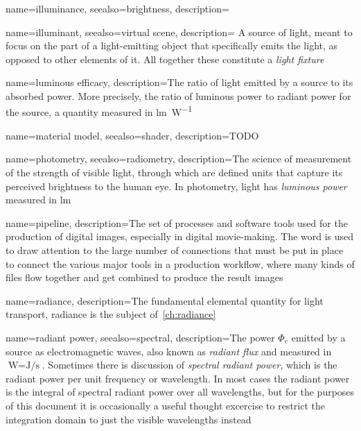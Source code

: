 {
	name=illuminance,
	seealso={brightness},
	description=\nopostdesc
}

{
	name=illuminant,
	seealso={virtual scene},
	description={
		A source of light, meant to focus on the part of a light-emitting object that
	    specifically emits the light, as opposed to other elements of it. All together
        these constitute a \textsl{light fixture}}
}

{
	name={luminous efficacy},
	description={The ratio of light emitted by a source to its absorbed power.
		More precisely, the ratio of luminous power to radiant power for the source,
		a quantity measured in \unit{\lumen\per\watt}}
}

{
	name={material model},
	seealso={shader},
	description={TODO}
}

{
	name={photometry},
	seealso={radiometry},
	description={The science of measurement of the strength of visible light, 
		through which are defined units that capture its perceived brightness 
		to the human eye. In photometry, light has \textsl{luminous power} 
		measured in \unit{\lumen}}
}


{
	name={pipeline},
	description={The set of processes and software tools used for the production of 
		digital images, especially in digital movie-making. The word is used to draw
		attention to the large number of connections that must be put in place to 
		connect the various major tools in a production workflow, where many kinds
		of files flow together and get combined to produce the result images}
}

{
	name=radiance,
	description={The fundamental elemental quantity for light transport, radiance
		is the subject of~\cref{ch:radiance}}
}

{
	name={radiant power},
	seealso={spectral},
	description={The power $\Phi_e$ emitted by a source as electromagnetic waves,
		also known as \textsl{radiant flux} and measured in 
		$\unit{\watt} = \unit{\joule\per\second}$. 
		Sometimes there is discussion of \textsl{spectral radiant power},
		which is the radiant power per unit frequency or wavelength.
		In most cases the radiant power is the integral of spectral radiant power
		over all wavelengths, but for the purposes of this document it is occasionally 
		a useful thought excercise to restrict the integration domain to just the
		visible wavelengths instead}
}

